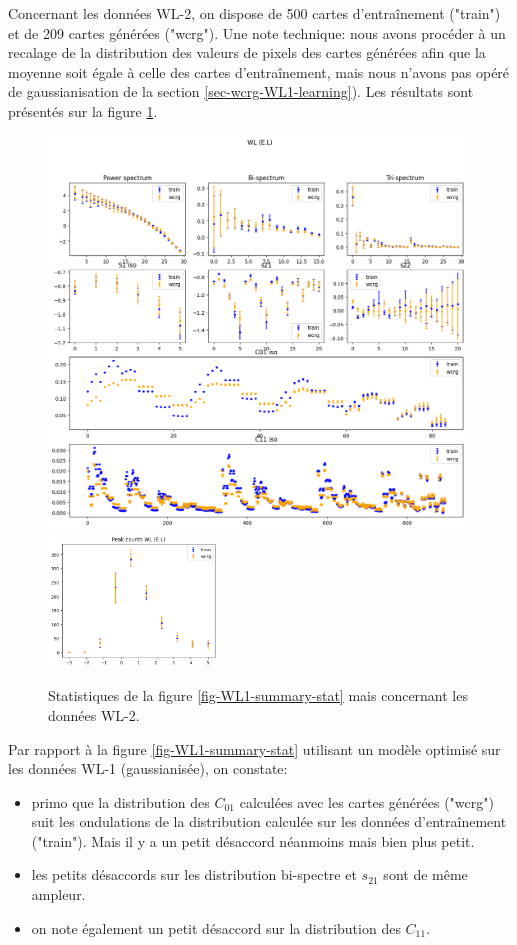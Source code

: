 \documentclass[12pt,twoside]{article}
\newcommand{\itemb}{\item[$\bullet$]}
\begin{document}
Concernant les données WL-2, on dispose de 500 cartes d'entraînement ("train") et de 209 cartes générées ("wcrg"). Une note technique: nous avons procéder à un recalage de la distribution des valeurs de pixels des cartes générées afin que la moyenne soit égale à celle des cartes d'entraînement, mais nous n'avons pas opéré de gaussianisation de la section \ref{sec-wcrg-WL1-learning}). Les résultats sont présentés sur la figure \ref{fig-WL2-summary-stat}.
\begin{figure}
\centering
\includegraphics[width=0.99\textwidth]{fig-WL2-summary-stat.png}\\
\includegraphics[width=0.4\textwidth]{fig-WL2-peak-count.png}
\caption{Statistiques de la figure \ref{fig-WL1-summary-stat} mais concernant les données WL-2.}
\label{fig-WL2-summary-stat}
\end{figure}

Par rapport à la figure \ref{fig-WL1-summary-stat} utilisant un modèle optimisé sur les données WL-1 (gaussianisée), on constate: 
\begin{itemize}
\itemb primo que la distribution des $C_{01}$  calculées avec les cartes générées ("wcrg") suit les ondulations de la distribution calculée sur les données d'entraînement ("train"). Mais il y a un petit désaccord néanmoins mais bien plus petit.
\itemb les petits désaccords sur les distribution bi-spectre et $s_{21}$ sont de même ampleur.
\itemb on note également un petit désaccord  sur la distribution des $C_{11}$.
\end{itemize}
\end{document}
